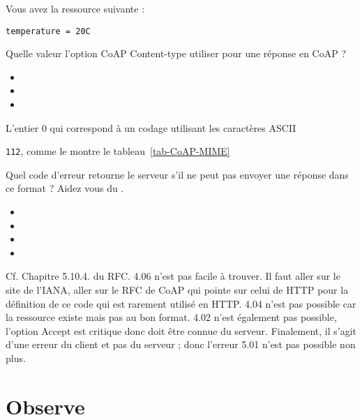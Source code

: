 {Vous avez la ressource suivante :

\texttt{temperature = 20C}

Quelle valeur l'option CoAP Content-type utiliser pour une réponse en CoAP ?

\begin{itemize}[label=$\circ$]
   \item {}
   \item {}
   \item {}
\end{itemize}
}
{L'entier 0 qui correspond à un codage utilisant les caractères ASCII}

{\texttt{112}, comme le montre le tableau~\vref{tab-CoAP-MIME}}

{Quel code d'erreur retourne le serveur s'il ne peut pas envoyer une réponse dans ce format ? Aidez vous du .
\begin{itemize}[label=$\circ$]
   \item {}
   \item {}
   \item {}
   \item {}
\end{itemize}
}
{
Cf. Chapitre 5.10.4. du RFC. 4.06 n'est pas facile à trouver. Il faut aller sur le site de l'IANA, aller sur le RFC de CoAP qui pointe sur celui de HTTP pour la définition de ce code qui est rarement utilisé en HTTP. 4.04 n'est pas possible car la ressource existe mais pas au bon format. 4.02 n'est également pas possible, l'option Accept est critique donc doit être connue du serveur. Finalement, il s'agit d'une erreur du client et pas du serveur ; donc l'erreur 5.01 n'est pas possible non plus.
}
    
\section {Observe}

